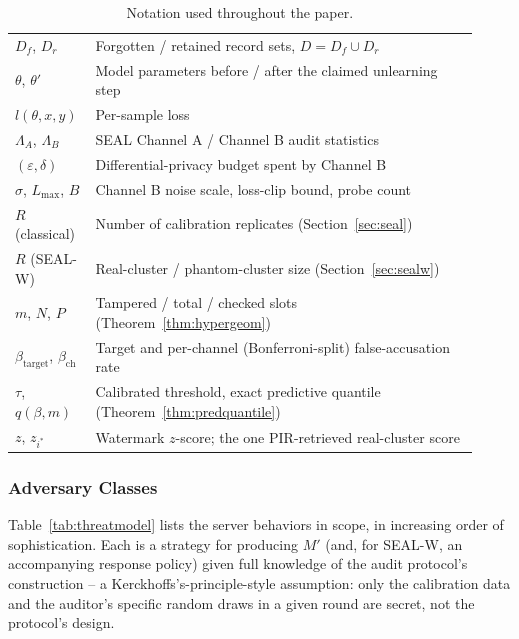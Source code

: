 \documentclass[10pt,journal,compsoc]{IEEEtran}
\begin{document}
\begin{table}[t]
\centering
\footnotesize
\caption{Notation used throughout the paper.}
\label{tab:notation}
\begin{tabular}{@{}p{0.14\linewidth}p{0.78\linewidth}@{}}
\toprule
$D_f$, $D_r$ & Forgotten / retained record sets, $D = D_f \cup D_r$ \\
$\theta$, $\theta'$ & Model parameters before / after the claimed unlearning step \\
$l(\theta,x,y)$ & Per-sample loss \\
$\Lambda_A$, $\Lambda_B$ & SEAL Channel A / Channel B audit statistics \\
$(\varepsilon,\delta)$ & Differential-privacy budget spent by Channel B \\
$\sigma$, $L_{\max}$, $B$ & Channel B noise scale, loss-clip bound, probe count \\
$R$ (classical) & Number of calibration replicates (Section~\ref{sec:seal}) \\
$R$ (SEAL-W) & Real-cluster / phantom-cluster size (Section~\ref{sec:sealw}) \\
$m$, $N$, $P$ & Tampered / total / checked slots (Theorem~\ref{thm:hypergeom}) \\
$\beta_{\text{target}}$, $\beta_{\text{ch}}$ & Target and per-channel (Bonferroni-split) false-accusation rate \\
$\tau$, $q(\beta,m)$ & Calibrated threshold, exact predictive quantile (Theorem~\ref{thm:predquantile}) \\
$z$, $z_{i^\ast}$ & Watermark $z$-score; the one PIR-retrieved real-cluster score \\
\bottomrule
\end{tabular}
\end{table}

\subsubsection{Adversary Classes}

Table~\ref{tab:threatmodel} lists the server behaviors in scope, in increasing order of sophistication. Each is a strategy for producing $M'$ (and, for SEAL-W, an accompanying response policy) given full knowledge of the audit protocol's construction -- a Kerckhoffs's-principle-style assumption: only the calibration data and the auditor's specific random draws in a given round are secret, not the protocol's design.
\end{document}
